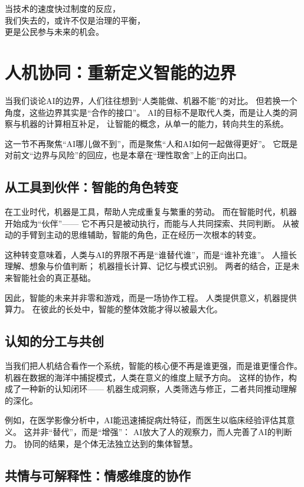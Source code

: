 \begin{center}
当技术的速度快过制度的反应，\\
我们失去的，或许不仅是治理的平衡，\\
更是公民参与未来的机会。
\end{center}

\section{人机协同：重新定义智能的边界}

当我们谈论AI的边界，人们往往想到“人类能做、机器不能”的对比。
但若换一个角度，这些边界其实是“合作的接口”。
AI的目标不是取代人类，而是让人类的洞察与机器的计算相互补足，
让智能的概念，从单一的能力，转向共生的系统。

这一节不再聚焦“AI哪儿做不到”，而是聚焦“人和AI如何一起做得更好”。
它既是对前文“边界与风险”的回应，也是本章在“理性取舍”上的正向出口。

\subsection{从工具到伙伴：智能的角色转变}

在工业时代，机器是工具，帮助人完成重复与繁重的劳动。
而在智能时代，机器开始成为“伙伴”——
它不再只是被动执行，而能与人共同探索、共同判断。
从被动的手臂到主动的思维辅助，智能的角色，正在经历一次根本的转变。

这种转变意味着，人类与AI的界限不再是“谁替代谁”，而是“谁补充谁”。
人擅长理解、想象与价值判断；
机器擅长计算、记忆与模式识别。
两者的结合，正是未来智能社会的真正基础。

因此，智能的未来并非零和游戏，而是一场协作工程。
人类提供意义，机器提供算力。
在彼此的长处中，智能的整体效能才得以被最大化。

\subsection{认知的分工与共创}

当我们把人机结合看作一个系统，智能的核心便不再是谁更强，而是谁更懂合作。
机器在数据的海洋中捕捉模式，人类在意义的维度上赋予方向。
这样的协作，构成了一种新的认知闭环——
机器生成洞察，人类筛选与修正，二者共同推动理解的深化。

例如，在医学影像分析中，AI能迅速捕捉病灶特征，而医生以临床经验评估其意义。
这并非“替代”，而是“增强”：
AI放大了人的观察力，而人完善了AI的判断力。
协同的结果，是个体无法独立达到的集体智慧。

\subsection{共情与可解释性：情感维度的协作}

